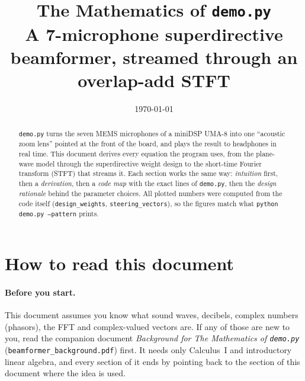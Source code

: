 \documentclass[11pt]{article}
\title{\textbf{The Mathematics of \texttt{demo.py}}\\[4pt]
\large A 7-microphone superdirective beamformer, streamed through an overlap-add STFT}
\date{\today}
\begin{document}
\maketitle

\begin{abstract}
\noindent
\texttt{demo.py} turns the seven MEMS microphones of a miniDSP UMA-8 into one ``acoustic zoom lens''
pointed at the front of the board, and plays the result to headphones in real time.
This document derives every equation the program uses, from the plane-wave model through the
superdirective weight design to the short-time Fourier transform (STFT) that streams it.
Each section works the same way: \emph{intuition} first, then a \emph{derivation}, then a
\emph{code map} with the exact lines of \texttt{demo.py}, then the \emph{design rationale}
behind the parameter choices. All plotted numbers were computed from the code itself
(\texttt{design\_weights}, \texttt{steering\_vectors}), so the figures match what
\texttt{python demo.py --pattern} prints.
\end{abstract}

\section*{How to read this document}

\paragraph{Before you start.} This document assumes you know what sound waves, decibels, complex
numbers (phasors), the FFT and complex-valued vectors are. If any of those are new to you, read the
companion document \emph{Background for The Mathematics of \texttt{demo.py}}
(\texttt{beamformer\_background.pdf}) first. It needs only Calculus~I and introductory linear
algebra, and every section of it ends by pointing back to the section of this document where the
idea is used.
\end{document}
